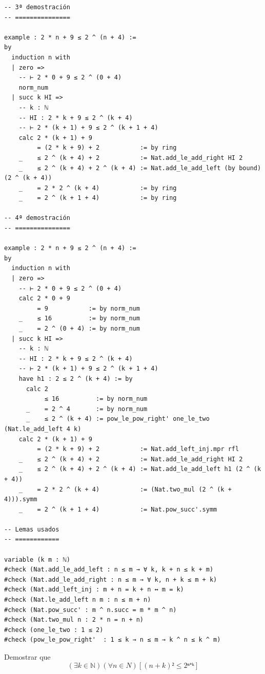 \begin{verbatim}
-- 3ª demostración
-- ===============

example : 2 * n + 9 ≤ 2 ^ (n + 4) :=
by
  induction n with
  | zero =>
    -- ⊢ 2 * 0 + 9 ≤ 2 ^ (0 + 4)
    norm_num
  | succ k HI =>
    -- k : ℕ
    -- HI : 2 * k + 9 ≤ 2 ^ (k + 4)
    -- ⊢ 2 * (k + 1) + 9 ≤ 2 ^ (k + 1 + 4)
    calc 2 * (k + 1) + 9
         = (2 * k + 9) + 2           := by ring
    _    ≤ 2 ^ (k + 4) + 2           := Nat.add_le_add_right HI 2
    _    ≤ 2 ^ (k + 4) + 2 ^ (k + 4) := Nat.add_le_add_left (by bound) (2 ^ (k + 4))
    _    = 2 * 2 ^ (k + 4)           := by ring
    _    = 2 ^ (k + 1 + 4)           := by ring

-- 4ª demostración
-- ===============

example : 2 * n + 9 ≤ 2 ^ (n + 4) :=
by
  induction n with
  | zero =>
    -- ⊢ 2 * 0 + 9 ≤ 2 ^ (0 + 4)
    calc 2 * 0 + 9
         = 9           := by norm_num
    _    ≤ 16          := by norm_num
    _    = 2 ^ (0 + 4) := by norm_num
  | succ k HI =>
    -- k : ℕ
    -- HI : 2 * k + 9 ≤ 2 ^ (k + 4)
    -- ⊢ 2 * (k + 1) + 9 ≤ 2 ^ (k + 1 + 4)
    have h1 : 2 ≤ 2 ^ (k + 4) := by
      calc 2
           ≤ 16          := by norm_num
      _    = 2 ^ 4       := by norm_num
      _    ≤ 2 ^ (k + 4) := pow_le_pow_right' one_le_two (Nat.le_add_left 4 k)
    calc 2 * (k + 1) + 9
         = (2 * k + 9) + 2           := Nat.add_left_inj.mpr rfl
    _    ≤ 2 ^ (k + 4) + 2           := Nat.add_le_add_right HI 2
    _    ≤ 2 ^ (k + 4) + 2 ^ (k + 4) := Nat.add_le_add_left h1 (2 ^ (k + 4))
    _    = 2 * 2 ^ (k + 4)           := (Nat.two_mul (2 ^ (k + 4))).symm
    _    = 2 ^ (k + 1 + 4)           := Nat.pow_succ'.symm

-- Lemas usados
-- ============

variable (k m : ℕ)
#check (Nat.add_le_add_left : n ≤ m → ∀ k, k + n ≤ k + m)
#check (Nat.add_le_add_right : n ≤ m → ∀ k, n + k ≤ m + k)
#check (Nat.add_left_inj : m + n = k + n ↔ m = k)
#check (Nat.le_add_left n m : n ≤ m + n)
#check (Nat.pow_succ' : m ^ n.succ = m * m ^ n)
#check (Nat.two_mul n : 2 * n = n + n)
#check (one_le_two : 1 ≤ 2)
#check (pow_le_pow_right'  : 1 ≤ k → n ≤ m → k ^ n ≤ k ^ m)
\end{verbatim}

\begin{ejercicio}
Demostrar que
\[ (∃ k ∈ ℕ)(∀ n ∈ N)[(n + k)² ≤ 2ⁿ⁺ᵏ] \]
\end{ejercicio}

